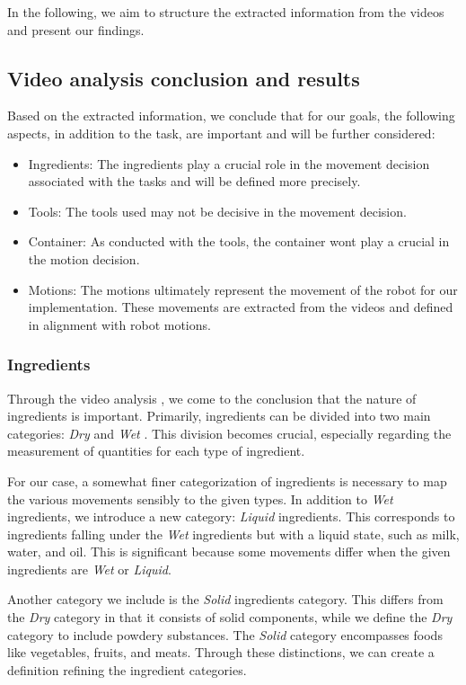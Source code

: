 In the following, we aim to structure the extracted information from the videos and present our findings.

\subsection*{Video analysis conclusion and results}

Based on the extracted information, we conclude that for our goals, the following aspects, in addition to the task, are important and will be further considered:
\begin{itemize}
  \item Ingredients: The ingredients play a crucial role in the movement decision associated with the tasks and will be defined more precisely.
  \item Tools: The tools used may not be decisive in the movement decision.
  \item Container: As conducted with the tools, the container wont play a crucial in the motion decision.
  \item Motions: The motions ultimately represent the movement of the robot for our implementation. These movements are extracted from the videos and defined in alignment with robot motions.
\end{itemize}

\subsubsection*{Ingredients}
Through the video analysis , we come to the conclusion that the nature of ingredients is important. 
Primarily, ingredients can be divided into two main categories: \textit{Dry} and \textit{Wet} \cite{Ohene2017}. This division becomes crucial, especially regarding the measurement of quantities for each type of ingredient.

For our case, a somewhat finer categorization of ingredients is necessary to map the various movements sensibly to the given types. In addition to \textit{Wet} ingredients, we introduce a new category: \textit{Liquid} ingredients. 
This corresponds to ingredients falling under the \textit{Wet} ingredients but with a liquid state, such as milk, water, and oil. This is significant because some movements differ when the given ingredients are \textit{Wet} or \textit{Liquid}.

Another category we include is the \textit{Solid} ingredients category. This differs from the \textit{Dry} category in that it consists of solid components, while we define the \textit{Dry} category to include powdery substances. The \textit{Solid} category encompasses foods like vegetables, fruits, and meats. Through these distinctions, we can create a definition refining the ingredient categories.

